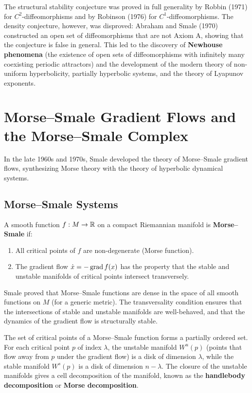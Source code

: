 The structural stability conjecture was proved in full generality by Robbin (1971) for \(C^2\)-diffeomorphisms and by Robinson (1976) for \(C^1\)-diffeomorphisms. The density conjecture, however, was disproved: Abraham and Smale (1970) constructed an open set of diffeomorphisms that are not Axiom A, showing that the conjecture is false in general. This led to the discovery of \textbf{Newhouse phenomena} (the existence of open sets of diffeomorphisms with infinitely many coexisting periodic attractors) and the development of the modern theory of non-uniform hyperbolicity, partially hyperbolic systems, and the theory of Lyapunov exponents.

\section{Morse--Smale Gradient Flows and the Morse--Smale Complex}

In the late 1960s and 1970s, Smale developed the theory of Morse--Smale gradient flows, synthesizing Morse theory with the theory of hyperbolic dynamical systems.

\subsection{Morse--Smale Systems}

\begin{definition}
A smooth function \(f: M \to \mathbb{R}\) on a compact Riemannian manifold is \textbf{Morse--Smale} if:
\begin{enumerate}
    \item All critical points of \(f\) are non-degenerate (Morse function).
    \item The gradient flow \(\dot{x} = -\operatorname{grad} f(x)\) has the property that the stable and unstable manifolds of critical points intersect transversely.
\end{enumerate}
\end{definition}

Smale proved that Morse--Smale functions are dense in the space of all smooth functions on \(M\) (for a generic metric). The transversality condition ensures that the intersections of stable and unstable manifolds are well-behaved, and that the dynamics of the gradient flow is structurally stable.

The set of critical points of a Morse--Smale function forms a partially ordered set. For each critical point \(p\) of index \(\lambda\), the unstable manifold \(W^u(p)\) (points that flow away from \(p\) under the gradient flow) is a disk of dimension \(\lambda\), while the stable manifold \(W^s(p)\) is a disk of dimension \(n - \lambda\). The closure of the unstable manifolds gives a cell decomposition of the manifold, known as the \textbf{handlebody decomposition} or \textbf{Morse decomposition}.

